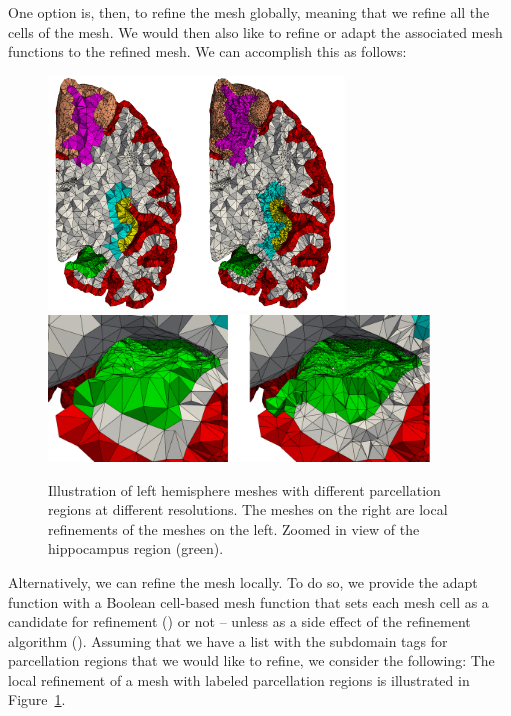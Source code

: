 One option is, then, to refine the mesh globally, meaning that we refine
all the cells of the mesh. We would then also like to refine or adapt the
associated mesh functions to the refined mesh. We can accomplish this
as follows:

\begin{figure}[t]	
  \begin{center}
    \includegraphics[width=0.7\textwidth]{./graphics/chp4/fenics-parcellation-crinkle.png} \\
    \includegraphics[width=0.9\textwidth]{./graphics/chp4/parcellations_refine_zoom.png}
  \end{center}
  \caption{Illustration of left hemisphere meshes with different
    parcellation regions at different resolutions. The meshes on the
    right are local refinements of the meshes on the left. Zoomed in view of the
    hippocampus region (green).}
  \label{fig:chp4:fenics-parc}
\end{figure}
Alternatively, we can refine the mesh locally. To do so, we
provide the adapt function with a Boolean cell-based mesh function
that sets each mesh cell as a candidate for refinement () or
not -- unless as a side effect of the refinement algorithm
(). Assuming that we have a list  with the
subdomain tags for parcellation regions that we would like to
refine, we consider the following:
The local refinement of a mesh with labeled parcellation regions is
illustrated in Figure~\ref{fig:chp4:fenics-parc}.

